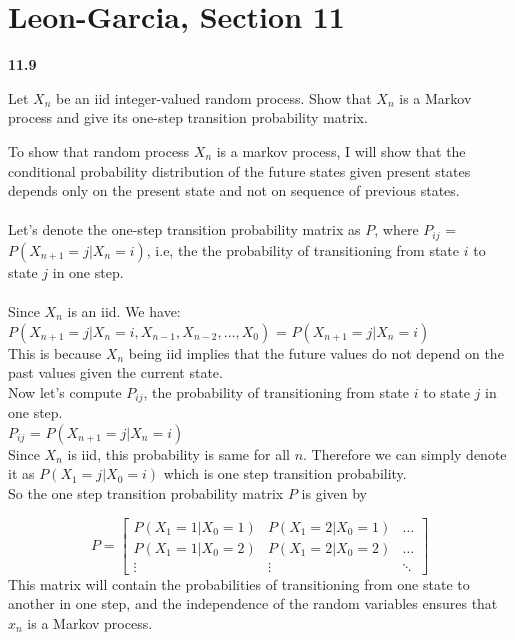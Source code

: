 \documentclass[answers]{exam}
\begin{document}
\section{Leon-Garcia, Section 11}
\begin{questions}
    \question \textbf{11.9}

    Let $X_n$ be an iid integer-valued random process. Show that $X_n$ is a Markov
    process and give its one-step transition probability matrix.
    \begin{solution}
        To show that random process $X_{n}$ is a markov process, I will show that the conditional probability distribution of the future states given present states depends only on the present state and not on sequence of previous states.
            \\~\\
            Let's denote the one-step transition probability matrix as $P$, where $P_{ij}$ = $P(X_{n+1} = j| X_{n} = i)$, i.e, the the probability of transitioning from state $i$ to state $j$ in one step. 
            \\~\\
            Since $X_{n}$ is an iid. We have: 
            \\
            $P(X_{n+1} = j| X_{n} = i,X_{n-1},X_{n-2},\ldots,X_{0} )$ = $P(X_{n+1} = j| X_{n} = i)$
            \\
            This is because $X_{n}$ being iid implies that the future values do not depend on the past values given the current state.
            \\
            Now let's compute $P_{ij}$, the probability of transitioning from state $i$ to state $j$ in one step. 
            \\
            $P_{ij}$ = $P(X_{n+1} = j | X_{n} = i)$
            \\
            Since $X_{n}$ is iid, this probability is same for all $n$. Therefore we can simply denote it as $P(X_{1} = j | X_{0} = i)$ which is one step transition probability. 
            \\
            So the one step transition probability matrix $P$ is given by 

            \[
P = \begin{bmatrix}
    P(X_1 = 1 | X_0 = 1) & P(X_1 = 2 | X_0 = 1) & \ldots \\
    P(X_1 = 1 | X_0 = 2) & P(X_1 = 2 | X_0 = 2) & \ldots \\
    \vdots & \vdots & \ddots
\end{bmatrix}
\]
This matrix will contain the probabilities of transitioning from one state to another in one step, and the independence of the random variables ensures that $x_{n}$ is a Markov process.


\end{solution}
\end{questions}
\end{document}
